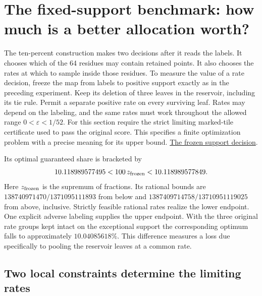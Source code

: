 \section{The fixed-support benchmark: how much is a better allocation worth?}
\label{sec:fixed-support-rates}

The ten-percent construction makes two decisions after it reads the labels. It chooses which of the 64 residues may contain retained points. It also chooses the rates at which to sample inside those residues. To measure the value of a rate decision, freeze the map from labels to positive support exactly as in the preceding experiment. Keep its deletion of three leaves in the reservoir, including its tie rule. Permit a separate positive rate on every surviving leaf. Rates may depend on the labeling, and the same rates must work throughout the allowed range \(0<\varepsilon<1/52\). For this section require the strict limiting marked-tile certificate used to pass the original score. This specifies a finite optimization problem with a precise meaning for its upper bound.
\href{https://github.com/nousentllc/riemann-hypothesis/blob/d67de1f6716496b98c8f0eb9f16b2a38c4f789c4/research/uriel/experiments/ten-percent-study/evidence/alternative/AUDIT.md}{The frozen support decision}.

Its optimal guaranteed share is bracketed by
\[
 10.118989577495 < 100\,z_{\rm frozen} < 10.118989577849 .
\]
Here \(z_{\rm frozen}\) is the supremum of fractions. Its rational bounds are \(138740971470/1371095111893\) from below and \(1387409714758/13710951119025\) from above, inclusive. Strictly feasible rational rates realize the lower endpoint. One explicit adverse labeling supplies the upper endpoint. With the three original rate groups kept intact on the exceptional support the corresponding optimum falls to approximately \(10.04085618\%\). This difference measures a loss due specifically to pooling the reservoir leaves at a common rate.

\subsection{Two local constraints determine the limiting rates}

